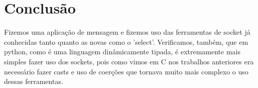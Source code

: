 \documentclass[10pt]{article}
\begin{document}
	\section{Conclusão}
	Fizemos uma aplicação de mensagem e fizemos uso das ferramentas de socket já conhecidas tanto quanto as novas como o 'select'. Verificamos, também, que em python, como é uma linguagem dinâmicamente tipada, é extremamente mais simples fazer uso dos sockets, pois como vimos em C nos trabalhos anteriores era necessário fazer casts e uso de coerções que tornava muito mais complexo o uso dessas ferramentas.
\end{document}

